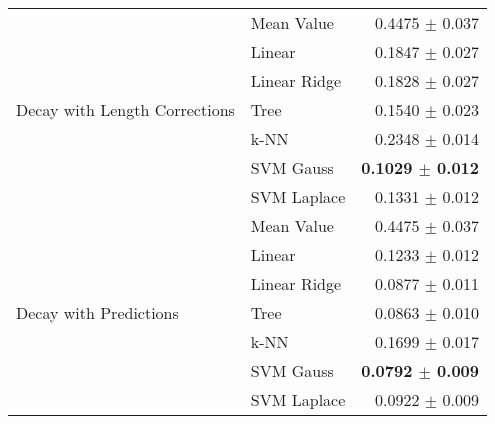 \documentclass[10pt]{article}
\begin{document}
\begin{table}[H]
\begin{tabular}{llr}
    \hline
    \multirow{7}{*}{Decay with Length Corrections} & Mean Value   & 0.4475 $\pm$ 0.037 \\
                               & Linear       & 0.1847 $\pm$ 0.027 \\
                               & Linear Ridge & 0.1828 $\pm$ 0.027 \\
                               & Tree         & 0.1540 $\pm$ 0.023 \\
                               & k-NN         & 0.2348 $\pm$ 0.014 \\
                               & SVM Gauss    & \textbf{0.1029 $\pm$ 0.012} \\
                               & SVM Laplace  & 0.1331 $\pm$ 0.012 \\
    \hline
    \multirow{7}{*}{Decay with Predictions} & Mean Value   & 0.4475 $\pm$ 0.037 \\
                               & Linear       & 0.1233 $\pm$ 0.012 \\
                               & Linear Ridge & 0.0877 $\pm$ 0.011 \\
                               & Tree         & 0.0863 $\pm$ 0.010 \\
                               & k-NN         & 0.1699 $\pm$ 0.017 \\
                               & SVM Gauss    & \textbf{0.0792 $\pm$ 0.009} \\
                               & SVM Laplace  & 0.0922 $\pm$ 0.009 \\
    \hline\hline
  \end{tabular}
  \label{tab:gapresults}
\end{table}





\end{document}
